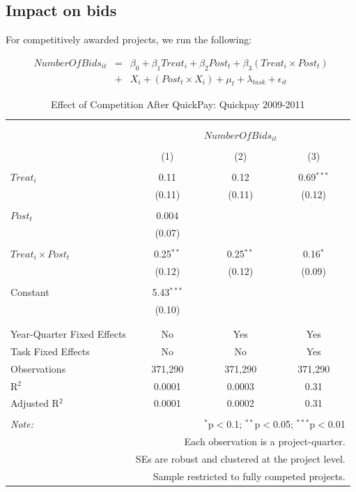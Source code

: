 \documentclass[
]{article}
\begin{document}
\hypertarget{impact-on-bids}{%
\subsection{Impact on bids}\label{impact-on-bids}}

For competitively awarded projects, we run the following:

\[ \begin{aligned}
NumberOfBids_{it} &=& \beta_0 + \beta_1 Treat_i + \beta_2 Post_t + \beta_3 (Treat_i \times Post_t) \\
&+&X_i + (Post_t \times X_i) + \mu_t + \lambda_{task}+ \epsilon_{it}
\end{aligned}\]

\begin{table}[H] \centering 
  \caption{Effect of Competition After QuickPay: Quickpay 2009-2011} 
  \label{} 
\small 
\begin{tabular}{@{\extracolsep{-2pt}}lccc} 
\\[-1.8ex]\hline 
\hline \\[-1.8ex] 
\\[-1.8ex] & \multicolumn{3}{c}{$NumberOfBids_{it}$} \\ 
\\[-1.8ex] & (1) & (2) & (3)\\ 
\hline \\[-1.8ex] 
 $Treat_i$ & 0.11 & 0.12 & 0.69$^{***}$ \\ 
  & (0.11) & (0.11) & (0.12) \\ 
  & & & \\ 
 $Post_t$ & 0.004 &  &  \\ 
  & (0.07) &  &  \\ 
  & & & \\ 
 $Treat_i \times Post_t$ & 0.25$^{**}$ & 0.25$^{**}$ & 0.16$^{*}$ \\ 
  & (0.12) & (0.12) & (0.09) \\ 
  & & & \\ 
 Constant & 5.43$^{***}$ &  &  \\ 
  & (0.10) &  &  \\ 
  & & & \\ 
\hline \\[-1.8ex] 
Year-Quarter Fixed Effects & No & Yes & Yes \\ 
Task Fixed Effects & No & No & Yes \\ 
Observations & 371,290 & 371,290 & 371,290 \\ 
R$^{2}$ & 0.0001 & 0.0003 & 0.31 \\ 
Adjusted R$^{2}$ & 0.0001 & 0.0002 & 0.31 \\ 
\hline 
\hline \\[-1.8ex] 
\textit{Note:}  & \multicolumn{3}{r}{$^{*}$p$<$0.1; $^{**}$p$<$0.05; $^{***}$p$<$0.01} \\ 
 & \multicolumn{3}{r}{Each observation is a project-quarter.} \\ 
 & \multicolumn{3}{r}{SEs are robust and clustered at the project level.} \\ 
 & \multicolumn{3}{r}{Sample restricted to fully competed projects.} \\ 
\end{tabular} 
\end{table}
\end{document}

